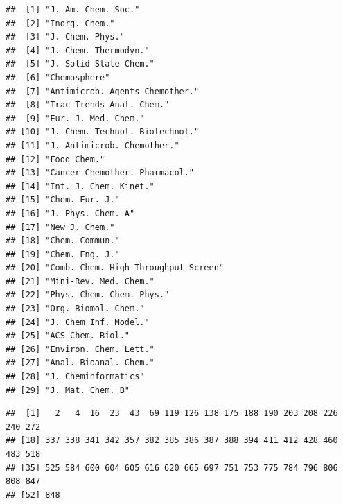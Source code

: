 \documentclass[]{book}
\newenvironment{Shaded}{\begin{snugshade}}{\end{snugshade}}
\newcommand{\KeywordTok}[1]{\textcolor[rgb]{0.13,0.29,0.53}{\textbf{#1}}}
\newcommand{\DecValTok}[1]{\textcolor[rgb]{0.00,0.00,0.81}{#1}}
\newcommand{\StringTok}[1]{\textcolor[rgb]{0.31,0.60,0.02}{#1}}
\newcommand{\CommentTok}[1]{\textcolor[rgb]{0.56,0.35,0.01}{\textit{#1}}}
\newcommand{\OperatorTok}[1]{\textcolor[rgb]{0.81,0.36,0.00}{\textbf{#1}}}
\newcommand{\NormalTok}[1]{#1}
\begin{document}
\begin{verbatim}
##  [1] "J. Am. Chem. Soc."                 
##  [2] "Inorg. Chem."                      
##  [3] "J. Chem. Phys."                    
##  [4] "J. Chem. Thermodyn."               
##  [5] "J. Solid State Chem."              
##  [6] "Chemosphere"                       
##  [7] "Antimicrob. Agents Chemother."     
##  [8] "Trac-Trends Anal. Chem."           
##  [9] "Eur. J. Med. Chem."                
## [10] "J. Chem. Technol. Biotechnol."     
## [11] "J. Antimicrob. Chemother."         
## [12] "Food Chem."                        
## [13] "Cancer Chemother. Pharmacol."      
## [14] "Int. J. Chem. Kinet."              
## [15] "Chem.-Eur. J."                     
## [16] "J. Phys. Chem. A"                  
## [17] "New J. Chem."                      
## [18] "Chem. Commun."                     
## [19] "Chem. Eng. J."                     
## [20] "Comb. Chem. High Throughput Screen"
## [21] "Mini-Rev. Med. Chem."              
## [22] "Phys. Chem. Chem. Phys."           
## [23] "Org. Biomol. Chem."                
## [24] "J. Chem Inf. Model."               
## [25] "ACS Chem. Biol."                   
## [26] "Environ. Chem. Lett."              
## [27] "Anal. Bioanal. Chem."              
## [28] "J. Cheminformatics"                
## [29] "J. Mat. Chem. B"
\end{verbatim}

\begin{Shaded}
\end{Shaded}

\begin{verbatim}
##  [1]   2   4  16  23  43  69 119 126 138 175 188 190 203 208 226 240 272
## [18] 337 338 341 342 357 382 385 386 387 388 394 411 412 428 460 483 518
## [35] 525 584 600 604 605 616 620 665 697 751 753 775 784 796 806 808 847
## [52] 848
\end{verbatim}

\begin{Shaded}
\end{Shaded}
\end{document}
